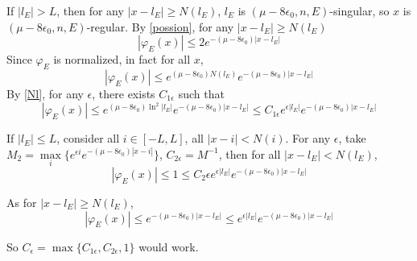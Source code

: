 If $|l_E|>L$, then for any $|x-l_E|\geq N(l_E)$, $l_E$ is $(\mu-8\epsilon_0,n,E)$-singular, so $x$ is $(\mu-8\epsilon_0,n,E)$-regular. By \eqref{possion}, for any $|x-l_E|\geq N(l_E)$
  \[
    |\varphi_E(x)|\leq 2e^{-(\mu-8\epsilon_0)|x-l_E|}
  \]
Since $\varphi_E$ is normalized, in fact for all $x$,
\[
  |\varphi_E(x)|\leq e^{(\mu-8\epsilon_0)N(l_E)}e^{-(\mu-8\epsilon_0)|x-l_E|}
\]
By \eqref{Nl}, for any $\epsilon$, there exists $C_{1\epsilon}$ such that
\[
  |\varphi_E(x)|\leq e^{(\mu-8\epsilon_0)\ln^2 |l_E|} e^{-(\mu-8\epsilon_0)|x-l_E|}\leq C_{1\epsilon} e^{\epsilon |l_E|} e^{-(\mu-8\epsilon_0)|x-l_E|}
\]

If $|l_E|\leq L$, consider all $i\in[-L,L]$, all $|x-i|<N(i)$. For any $\epsilon$, take $M_2=\max\limits_i\{e^{\epsilon i} e^{-(\mu-8\epsilon_0)|x-i|}\}$, $C_{2\epsilon}=M^{-1}$, then for all  $|x-l_E|< N(l_E)$,
\[
  |\varphi_E(x)|\leq 1\leq C_2\epsilon e^{\epsilon |l_E|} e^{-(\mu-8\epsilon_0)|x-l_E|}
\]

As for $|x-l_E|\geq N(l_E)$,
\[
  |\varphi_E(x)|\leq e^{-(\mu-8\epsilon_0)|x-l_E|}\leq e^{\epsilon |l_E|}e^{-(\mu-8\epsilon_0)|x-l_E|}
\]

So  $C_\epsilon=\max\{C_{1\epsilon},C_{2\epsilon},1\}$ would work.
